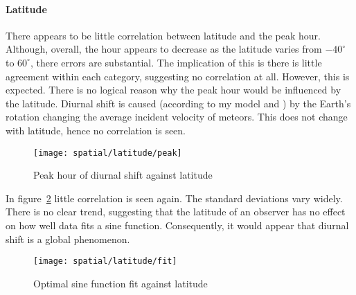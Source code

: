 \paragraph{Latitude\\}
There appears to be little correlation between latitude and the peak hour. Although, overall, the hour appears to decrease as the latitude varies from $-40^{\circ}$ to $60^{\circ}$, there errors are substantial. The implication of this is there is little agreement within each category, suggesting no correlation at all. However, this is expected. There is no logical reason why the peak hour would be influenced by the latitude. Diurnal shift is caused (according to my model and \cite{baa}) by the Earth's rotation changing the average incident velocity of meteors. This does not change with latitude, hence no correlation is seen.
\begin{figure}[h!]
	\centering
	\texttt{[image: spatial/latitude/peak]}
	\caption{Peak hour of diurnal shift against latitude
		\label{fig:dishift:lat:peak}}
\end{figure}

In figure~\ref{fig:dishift:lat:fit} little correlation is seen again. The standard deviations vary widely. There is no clear trend, suggesting that the latitude of an observer has no effect on how well data fits a sine function. Consequently, it would appear that diurnal shift is a global phenomenon.
\begin{figure}[h!]
	\centering
	\texttt{[image: spatial/latitude/fit]}
	\caption{Optimal sine function fit against latitude
		\label{fig:dishift:lat:fit}}
\end{figure}

